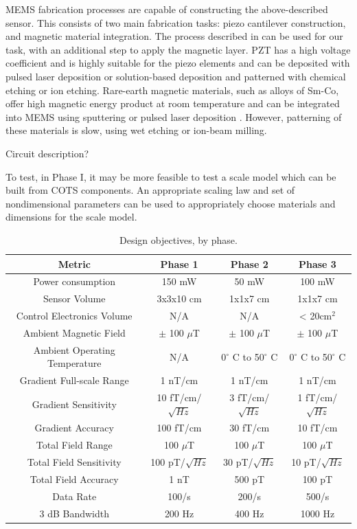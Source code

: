 MEMS fabrication processes are capable of constructing the above-described sensor. This consists of two main fabrication tasks: piezo cantilever construction, and magnetic material integration. The process described in \cite{shen2008design} can be used for our task, with an additional step to apply the magnetic layer. PZT has a high voltage coefficient and is highly suitable for the piezo elements \cite{tadigadapa2009piezoelectric} and can be deposited with pulsed laser deposition or solution-based deposition and patterned with chemical etching or ion etching. Rare-earth magnetic materials, such as alloys of Sm-Co, offer high magnetic energy product at room temperature and can be integrated into MEMS using sputtering or pulsed laser deposition \cite{arnold2009permanent}. However, patterning of these materials is slow, using wet etching or ion-beam milling.  

Circuit description?

To test, in Phase I, it may be more feasible to test a scale model which can be built from COTS components. An appropriate scaling law and set of nondimensional parameters can be used to appropriately choose materials and dimensions for the scale model.

\begin{table}[h!]
\centering
  \begin{tabular}{|c||c|c|c|}
    \hline
    Metric & Phase 1 & Phase 2 & Phase 3 \\
    \hline
    \hline
    Power consumption & 150 mW & 50 mW & 100 mW \\
    \hline
    Sensor Volume & 3x3x10 cm & 1x1x7 cm & 1x1x7 cm \\
    \hline
    Control Electronics Volume  & N/A & N/A & < 20cm$^2$ \\
    \hline
    Ambient Magnetic Field & $\pm$ 100 $\mu$T & $\pm$ 100 $\mu$T & $\pm$ 100 $\mu$T \\
    \hline
    Ambient Operating Temperature & N/A & 0$^{\circ}$ C to 50$^{\circ}$ C & 0$^{\circ}$ C to 50$^{\circ}$ C \\
    \hline
    Gradient Full-scale Range & 1 nT/cm & 1 nT/cm & 1 nT/cm \\
    \hline
    Gradient Sensitivity & 10 fT/cm/$\sqrt{Hz}$ & 3 fT/cm/$\sqrt{Hz}$  & 1 fT/cm/$\sqrt{Hz}$ \\
    \hline
    Gradient Accuracy & 100 fT/cm & 30 fT/cm & 10 fT/cm \\
    \hline
    Total Field Range & 100 $\mu$T & 100 $\mu$T & 100 $\mu$T \\
    \hline
    Total Field Sensitivity & 100 pT/$\sqrt{Hz}$ & 30 pT/$\sqrt{Hz}$  &  10 pT/$\sqrt{Hz}$ \\
    \hline
    Total Field Accuracy & 1 nT & 500 pT & 100 pT \\
    \hline
    Data Rate & 100/s & 200/s & 500/s \\
    \hline
    3 dB Bandwidth & 200 Hz & 400 Hz & 1000 Hz\\
    \hline
  \end{tabular}
\caption{Design objectives, by phase.}
\label{table:obj}
\end{table}

